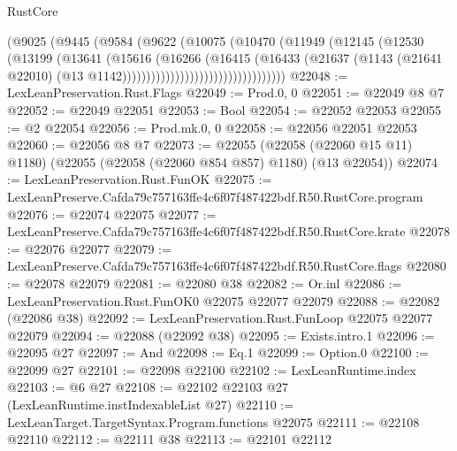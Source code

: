 \begin{lexlean}{RustCore}
\begin{coremodule}
                                    (@9025
                                      (@9445
                                        (@9584
                                          (@9622
                                            (@10075
                                              (@10470
                                                (@11949
                                                  (@12145
                                                    (@12530
                                                      (@13199
                                                        (@13641
                                                          (@15616
                                                            (@16266
                                                              (@16415
                                                                (@16433
                                                                  (@21637
                                                                    (@1143
                                                                      (@21641 @22010)
                                                                      (@13
                                                                        @1142))))))))))))))))))))))))))))))))))
@22048 := LexLeanPreservation.Rust.Flags
@22049 := Prod.{0, 0}
@22051 := @22049 @8 @7
@22052 := @22049 @22051
@22053 := Bool
@22054 := @22052 @22053
@22055 := @2 @22054
@22056 := Prod.mk.{0, 0}
@22058 := @22056 @22051 @22053
@22060 := @22056 @8 @7
@22073 := @22055
    (@22058 (@22060 @15 @11) @1180)
    (@22055 (@22058 (@22060 @854 @857) @1180) (@13 @22054))
@22074 := LexLeanPreservation.Rust.FunOK
@22075 := LexLeanPreserve.Cafda79c757163ffe4c6f07f487422bdf.R50.RustCore.program
@22076 := @22074 @22075
@22077 := LexLeanPreserve.Cafda79c757163ffe4c6f07f487422bdf.R50.RustCore.krate
@22078 := @22076 @22077
@22079 := LexLeanPreserve.Cafda79c757163ffe4c6f07f487422bdf.R50.RustCore.flags
@22080 := @22078 @22079
@22081 := @22080 @38
@22082 := Or.inl
@22086 := LexLeanPreservation.Rust.FunOK0 @22075 @22077 @22079
@22088 := @22082 (@22086 @38)
@22092 := LexLeanPreservation.Rust.FunLoop @22075 @22077 @22079
@22094 := @22088 (@22092 @38)
@22095 := Exists.intro.{1}
@22096 := @22095 @27
@22097 := And
@22098 := Eq.{1}
@22099 := Option.{0}
@22100 := @22099 @27
@22101 := @22098 @22100
@22102 := LexLeanRuntime.index
@22103 := @6 @27
@22108 := @22102 @22103 @27 (LexLeanRuntime.instIndexableList @27)
@22110 := LexLeanTarget.TargetSyntax.Program.functions @22075
@22111 := @22108 @22110
@22112 := @22111 @38
@22113 := @22101 @22112

\end{coremodule}
\end{lexlean}

